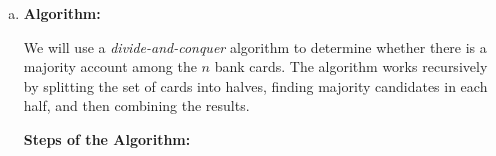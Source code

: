 \documentclass[10pt,letter,notitlepage]{article}
\begin{document}
\begin{Answer}
%
%
%
%
%
%
%
%

\begin{enumerate}[(a)]
    \item \textbf{Algorithm:}

    We will use a \textit{divide-and-conquer} algorithm to determine whether there is a majority account among the $n$ bank cards. The algorithm works recursively by splitting the set of cards into halves, finding majority candidates in each half, and then combining the results.

    \textbf{Steps of the Algorithm:}


\end{enumerate}
\end{Answer}
\end{document}
